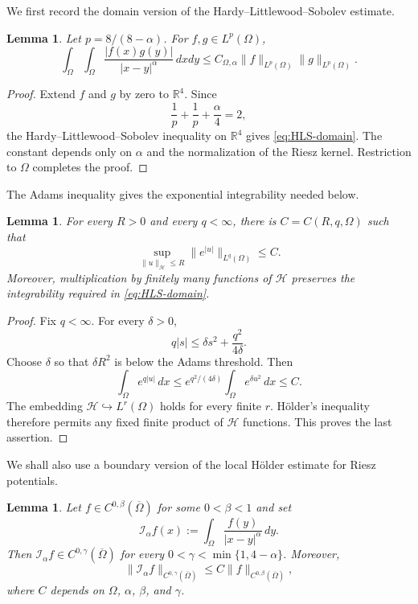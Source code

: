 \documentclass[11pt]{article}
\newtheorem{lemma}[theorem]{Lemma}
\numberwithin{equation}{section}
\begin{document}
We first record the domain version of the Hardy--Littlewood--Sobolev estimate.

\begin{lemma}\label{lem:HLS-domain}
Let $p=8/(8-\alpha)$. For $f,g\in L^p(\Omega)$,
\begin{equation}\label{eq:HLS-domain}
\int_\Omega\int_\Omega
\frac{|f(x)g(y)|}{|x-y|^\alpha}\,dxdy
\leq C_{\Omega,\alpha}\|f\|_{L^p(\Omega)}
\|g\|_{L^p(\Omega)}.
\end{equation}
\end{lemma}

\begin{proof}
Extend $f$ and $g$ by zero to $\mathbb R^4$. Since
\[
\frac1p+\frac1p+\frac\alpha4=2,
\]
the Hardy--Littlewood--Sobolev inequality on $\mathbb R^4$ gives
\eqref{eq:HLS-domain}. The constant depends only on $\alpha$ and the
normalization of the Riesz kernel. Restriction to $\Omega$ completes
the proof.
\end{proof}

The Adams inequality gives the exponential integrability needed below.

\begin{lemma}\label{lem:Adams-consequence}
For every $R>0$ and every $q<\infty$, there is $C=C(R,q,\Omega)$ such
that
\begin{equation*}
\sup_{\|u\|_{\mathcal H}\leq R}
\|e^{|u|}\|_{L^q(\Omega)}\leq C.
\end{equation*}
Moreover, multiplication by finitely many functions of $\mathcal H$
preserves the integrability required in \eqref{eq:HLS-domain}.
\end{lemma}

\begin{proof}
Fix $q<\infty$. For every $\delta>0$,
\begin{equation*}
q|s|\leq\delta s^2+\frac{q^2}{4\delta}.
\end{equation*}
Choose $\delta$ so that $\delta R^2$ is below the Adams threshold.
Then
\[
\int_\Omega e^{q|u|}\,dx
\leq e^{q^2/(4\delta)}\int_\Omega e^{\delta u^2}\,dx
\leq C.
\]
The embedding $\mathcal H\hookrightarrow L^r(\Omega)$ holds for
every finite $r$. H\"older's inequality therefore permits any fixed
finite product of $\mathcal H$ functions. This proves the last
assertion.
\end{proof}

We shall also use a boundary version of the local H\"older estimate for
Riesz potentials.

\begin{lemma}\label{lem:boundary-Riesz-holder}
Let $f\in C^{0,\beta}(\overline\Omega)$ for some $0<\beta<1$ and set
\[
\mathcal I_\alpha f(x)
:=\int_\Omega\frac{f(y)}{|x-y|^\alpha}\,dy.
\]
Then $\mathcal I_\alpha f\in C^{0,\gamma}(\overline\Omega)$ for every
$0<\gamma<\min\{1,4-\alpha\}$. Moreover,
\[
\|\mathcal I_\alpha f\|_{C^{0,\gamma}(\overline\Omega)}
\leq C\|f\|_{C^{0,\beta}(\overline\Omega)},
\]
where $C$ depends on $\Omega$, $\alpha$, $\beta$, and $\gamma$.
\end{lemma}
\end{document}
